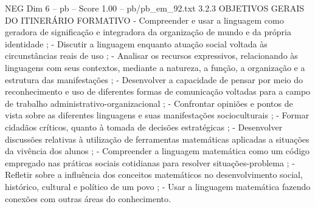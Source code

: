\begin{textsample}{NEG Dim 6 – pb – Score 1.00 – pb/pb\_em\_92.txt}  \label{ex:f6_neg_090}
3.2.3 OBJETIVOS GERAIS DO ITINERÁRIO FORMATIVO - Compreender e usar a linguagem como geradora de significação e integradora da organização de mundo e da própria identidade ; - Discutir a linguagem enquanto atuação social voltada às circunstâncias reais de uso ; - Analisar os recursos expressivos, relacionando às linguagens com seus contextos, mediante a natureza, a função, a organização e a estrutura das manifestações ; - Desenvolver a capacidade de pensar por meio do reconhecimento e uso de diferentes formas de comunicação voltadas para a campo de trabalho administrativo-organizacional ; - Confrontar opiniões e pontos de vista sobre as diferentes linguagens e suas manifestações socioculturais ; - Formar cidadãos críticos, quanto à tomada de decisões estratégicas ; - Desenvolver discussões relativas à utilização de ferramentas matemáticas aplicadas a situações da vivência dos alunos ; - Compreender a linguagem matemática como um código empregado nas práticas sociais cotidianas para resolver situações-problema ; - Refletir sobre a influência dos conceitos matemáticos no desenvolvimento social, histórico, cultural e político de um povo ; - Usar a linguagem matemática fazendo conexões com outras áreas do conhecimento.

\end{textsample}
